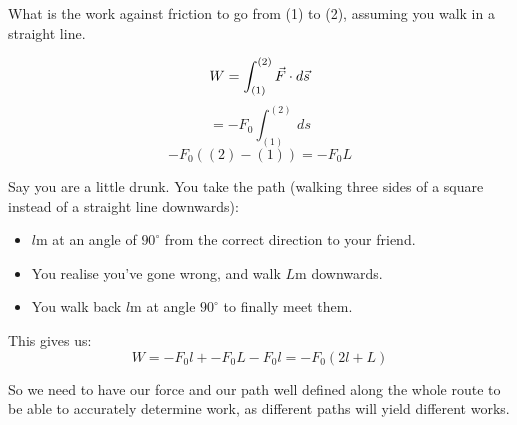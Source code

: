 What is the work against friction to go from (1) to (2), assuming you walk in a straight line.

\[
    W = \int_{(1)}^{(2)} \vec{F} \cdot d \vec{s}
\]
\[
    = - F_0 \int_{(1)}^{(2)}  \, ds
\]
 \[
     -F_0 ((2) - (1)) = -F_0 L
 \]
 
Say you are a little drunk. You take the path (walking three sides of a square instead of a straight line downwards):
\begin{itemize}
    \item $l$m at an angle of $90^\circ$ from the correct direction to your friend.
    \item You realise you've gone wrong, and walk $L$m downwards.
    \item You walk back $l$m at angle $90^\circ$ to finally meet them.
\end{itemize}

This gives us:
\[
    W = -F_0 l + -F_0 L - F_0 l = -F_0(2l + L)
\]

So we need to have our force and our path well defined along the whole route to be able to accurately determine work, as different paths will yield different works.
